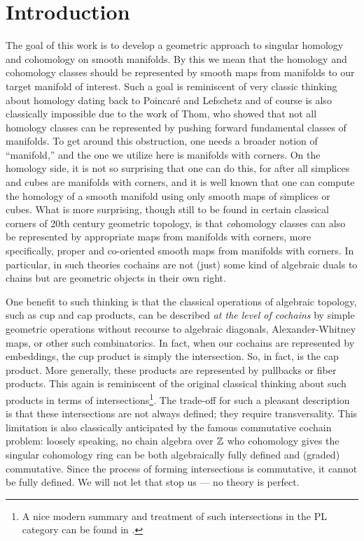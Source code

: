 
\section{Introduction}\label{intro}

The goal of this work is to develop a geometric approach to singular homology and cohomology on smooth manifolds.
By this we mean that the homology and cohomology classes should be represented by smooth maps from manifolds to our target manifold of interest.
Such a goal is reminiscent of very classic thinking about homology dating back to Poincar\'e and Lefschetz and of course is also classically impossible due to the work of Thom, who showed that not all homology classes can be represented by pushing forward fundamental classes of manifolds.
To get around this obstruction, one needs a broader notion of ``manifold,'' and the one we utilize here is manifolds with corners.
On the homology side, it is not so surprising that one can do this, for after all simplices and cubes are manifolds with corners, and it is well known that one can compute the homology of a smooth manifold using only smooth maps of simplices or cubes.
What is more surprising, though still to be found in certain classical corners of 20th century geometric topology, is that {\it co}homology classes can also be represented by appropriate maps from manifolds with corners, more specifically, proper and co-oriented smooth maps from manifolds with corners.
In particular, in such theories cochains are not (just) some kind of algebraic duals to chains but are geometric objects in their own right.

One benefit to such thinking is that the classical operations of algebraic topology, such as cup and cap products, can be described {\it at the level of cochains} by simple geometric operations without recourse to algebraic diagonals, Alexander-Whitney maps, or other such combinatorics.
In fact, when our cochains are represented by embeddings, the cup product is simply the intersection.
So, in fact, is the cap product.
More generally, these products are represented by pullbacks or fiber products.
This again is reminiscent of the original classical thinking about such products in terms of intersections\footnote{A nice modern summary and treatment of such intersections in the PL category can be found in \cite{McC06}.}.
The trade-off for such a pleasant description is that these intersections are not always defined; they require transversality.
This limitation is also classically anticipated by the famous commutative cochain problem: loosely speaking, no chain algebra over $\mathbb{Z}$ who cohomology gives the singular cohomology ring can be both algebraically fully defined and (graded) commutative.
Since the process of forming intersections is commutative, it cannot be fully defined.
We will not let that stop us --- no theory is perfect.

